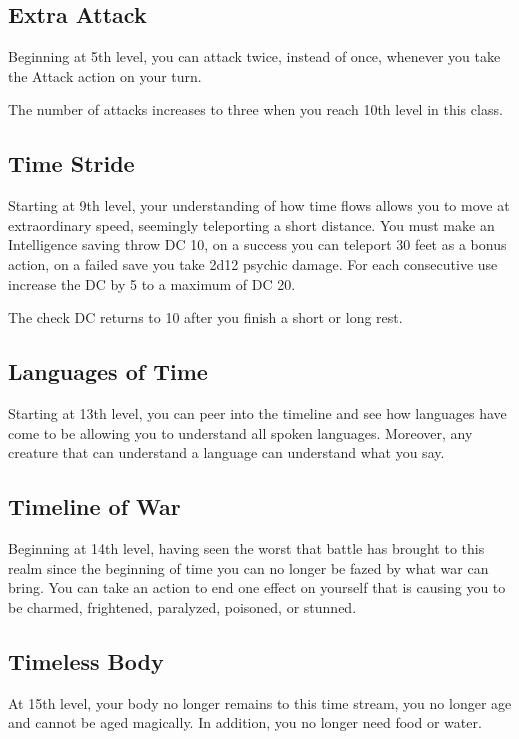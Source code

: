 \subsection{Extra Attack}

Beginning at 5th level, you can attack twice, instead of once, whenever you take the Attack action on your turn.

The number of attacks increases to three when you reach 10th level in this class.

\subsection{Time Stride}

Starting at 9th level, your understanding of how time flows allows you to move at extraordinary speed, seemingly teleporting a short distance. You must make an Intelligence saving throw DC 10, on a success you can teleport 30 feet as a bonus action, on a failed save you take 2d12 psychic damage. For each consecutive use increase the DC by 5 to a maximum of DC 20.

The check DC returns to 10 after you finish a short or long rest.

\subsection{Languages of Time}

Starting at 13th level, you can peer into the timeline and see how languages have come to be allowing you to understand all spoken languages. Moreover, any creature that can understand a language can understand what you say.

\subsection{Timeline of War}

Beginning at 14th level, having seen the worst that battle has brought to this realm since the beginning of time you can no longer be fazed by what war can bring. You can take an action to end one effect on yourself that is causing you to be charmed, frightened, paralyzed, poisoned, or stunned.

\subsection{Timeless Body}

At 15th level, your body no longer remains to this time stream, you no longer age and cannot be aged magically. In addition, you no longer need food or water.


